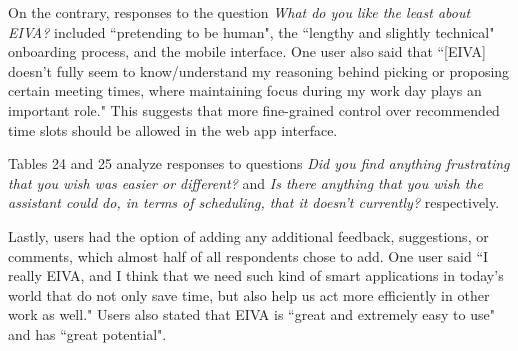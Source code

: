 \documentclass{article}
\begin{document}
On the contrary, responses to the question \emph{What do you like the least about EIVA?} included ``pretending to be human", the ``lengthy and slightly technical" onboarding process, and the mobile interface. One user also said that ``[EIVA] doesn't fully seem to know/understand my reasoning behind picking or proposing certain meeting times, where maintaining focus during my work day plays an important role." This suggests that more fine-grained control over recommended time slots should be allowed in the web app interface.

Tables 24 and 25 analyze responses to questions \emph{Did you find anything frustrating that you wish was easier or different?} and \emph{Is there anything that you wish the assistant could do, in terms of scheduling, that it doesn't currently?} respectively.

Lastly, users had the option of adding any additional feedback, suggestions, or comments, which almost half of all respondents chose to add. One user said ``I really EIVA, and I think that we need such kind of smart applications in today's world that do not only save time, but also help us act more efficiently in other work as well." Users also stated that EIVA is ``great and extremely easy to use" and has ``great potential".
\end{document}
